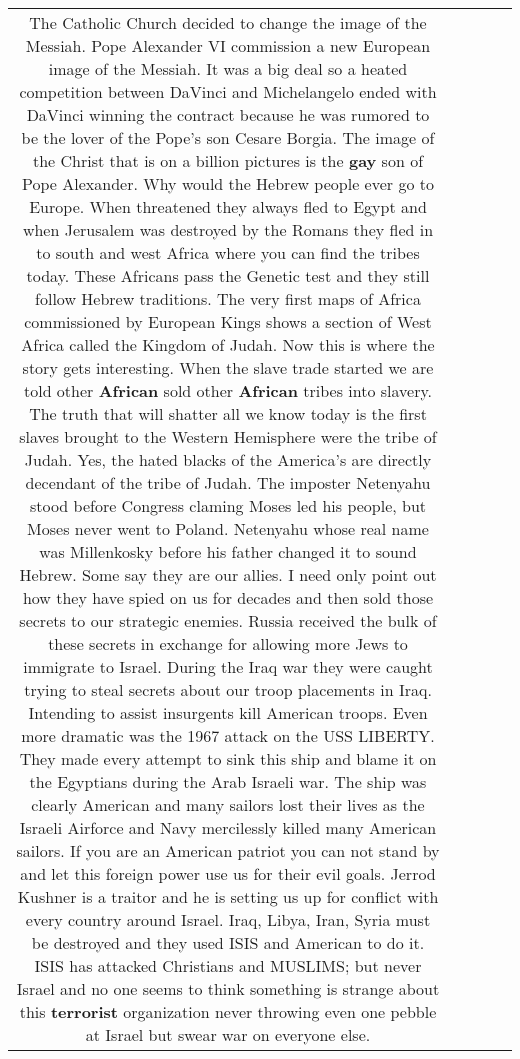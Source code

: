\documentclass[11pt]{article}
\newlength\mylength
\begin{document}
\begin{center}
\begin{longtable}{|C{.65\mylength}|C{.30\mylength}|C{.12\mylength}|C{.12\mylength}|C{.12\mylength}|}
The Catholic Church decided to change the image of the Messiah. Pope Alexander VI commission a new European image of the Messiah. It was a big deal so a heated competition between DaVinci and Michelangelo ended with DaVinci winning the contract because he was rumored to be the lover of the Pope's son Cesare Borgia. The image of the Christ that is on a billion pictures is the \textbf{g\textbf{ay}} son of Pope Alexander. 
Why would the Hebrew people ever go to Europe. When threatened they always fled to Egypt and when Jerusalem was destroyed by the Romans they fled in to south and west Africa where you can find the tribes today. These Africans pass the Genetic test and they still follow Hebrew traditions. 
The very first maps of Africa commissioned by European Kings shows a section of West Africa called the Kingdom of Judah. Now this is where the story gets interesting. When the slave trade started we are told other \textbf{African} sold other \textbf{African} tribes into slavery. The truth that will shatter all we know today is the first slaves brought to the Western Hemisphere were the tribe of Judah. Yes, the hated blacks of the America's are directly decendant of the tribe of Judah.
The imposter Netenyahu stood before Congress claming Moses led his people, but Moses never went to Poland. Netenyahu whose real name was Millenkosky before his father changed it to sound Hebrew.
Some say they are our allies. I need only point out how they have spied on us for decades and then sold those secrets to our strategic enemies. Russia received the bulk of these secrets in exchange for allowing more Jews to immigrate to Israel.
During the Iraq war they were caught trying to steal secrets about our troop placements in Iraq. Intending to assist insurgents kill American troops. Even more dramatic was the 1967 attack on the USS LIBERTY. They made every attempt to sink this ship and blame it on the Egyptians during the Arab Israeli war. The ship was clearly American and many sailors lost their lives as the Israeli Airforce and Navy mercilessly killed many American sailors.
If you are an American patriot you can not stand by and let this foreign power use us for their evil goals.
Jerrod Kushner is a traitor and he is setting us up for conflict with every country around Israel. Iraq, Libya, Iran, Syria must be destroyed and they used ISIS and American to do it. ISIS has attacked Christians and MUSLIMS; but never Israel and no one seems to think something is strange about this \textbf{terrorist} organization never throwing even one pebble at Israel but swear war on everyone else.

\end{longtable}
\end{center}
\end{document}
